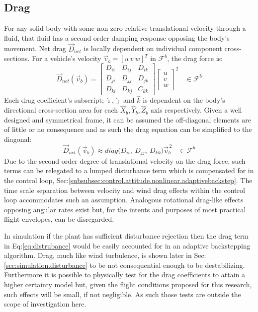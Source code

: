 \subsection{Drag}
\label{subsec:dynamics.aero.drag}
For any solid body with some non-zero relative translational velocity through a fluid, that fluid has a second order damping response opposing the body's movement. Net drag $\vec{D}_{net}$ is locally dependent on individual component cross-sections. For a vehicle's velocity $\vec{v}_b=[u~v~w]^T$ in $\mathcal{F}^b$, the drag force is:
\begin{equation}\label{eq:distrubance}
\vec{D}_{net}(\vec{v}_b)=\begin{bmatrix}
D_{ii} & D_{ij} & D_{ik}\\
D_{ji} & D_{jj} & D_{jk}\\
D_{ki} & D_{kj} & C_{kk}
\end{bmatrix}
\begin{bmatrix}
u\\
v\\
w
\end{bmatrix}^2
~~~~\in\mathcal{F}^b
\end{equation}
Each drag coefficient's subscript; $\hat{\imath},\hat{\jmath}$ and $\hat{k}$ is dependent on the body's directional cross-section area for each $\hat{X}_b,\hat{Y}_b,\hat{Z}_b$ axis respectively. Given a well designed and symmetrical frame, it can be assumed the off-diagonal elements are of little or no consequence and as such the drag equation can be simplified to the diagonal:
\begin{equation}
\vec{D}_{net}(\vec{v}_b)\approx diag\big(D_{ii},~D_{jj},~D_{kk}\big)\vec{v}_b^{\hspace{2pt}2}~~~~\in\mathcal{F}^b
\end{equation}
Due to the second order degree of translational velocity on the drag force, such terms can be relegated to a lumped disturbance term which is compensated for in the control loop, Sec:\ref{subsubsec:control.attitude.nonlinear.adaptivebackstep}. The time scale separation between velocity and wind drag effects within the control loop accommodates such an assumption. Analogous rotational drag-like effects opposing angular rates exist but, for the intents and purposes of most practical flight envelopes, can be disregarded. 
\par
In simulation if the plant has sufficient disturbance rejection then the drag term in Eq:\ref{eq:distrubance} would be easily accounted for in an adaptive backstepping algorithm. Drag, much like wind turbulence, is shown later in Sec:\ref{sec:simulation.disturbance} to be not consequential enough to be destabilizing. Furthermore it is possible to physically test for the drag coefficients to attain a higher certainty model but, given the flight conditions proposed for this research, such effects will be small, if not negligible. As such those tests are outside the scope of investigation here.
